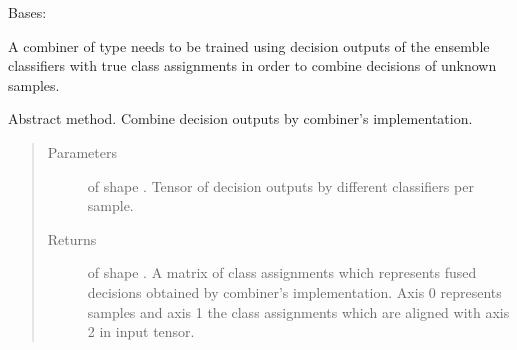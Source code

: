 \documentclass[letterpaper,10pt,english]{sphinxmanual}
\begin{document}

\begin{fulllineitems}
\label{\detokenize{pusion.core.combiner:pusion.core.combiner.TrainableCombiner}}
\sphinxAtStartPar
Bases: {\hyperref[\detokenize{pusion.core.combiner:pusion.core.combiner.Combiner}]{}}

\sphinxAtStartPar
A combiner of type {\hyperref[\detokenize{pusion.core.combiner:pusion.core.combiner.TrainableCombiner}]{}} needs to be trained using decision outputs of the ensemble classifiers
with true class assignments in order to combine decisions of unknown samples.

\begin{fulllineitems}
\label{\detokenize{pusion.core.combiner:pusion.core.combiner.TrainableCombiner.combine}}
\sphinxAtStartPar
Abstract method. Combine decision outputs by combiner’s implementation.
\begin{quote}\begin{description}
\item[{Parameters}] \leavevmode
\sphinxAtStartPar
{} \textendash{}  of shape .
Tensor of decision outputs by different classifiers per sample.

\item[{Returns}] \leavevmode
\sphinxAtStartPar
{} of shape . A matrix of class assignments which represents fused
decisions obtained by combiner’s implementation. Axis 0 represents samples and axis 1 the class
assignments which are aligned with axis 2 in  input tensor.

\end{description}\end{quote}


\end{fulllineitems}
\end{fulllineitems}
\end{document}
